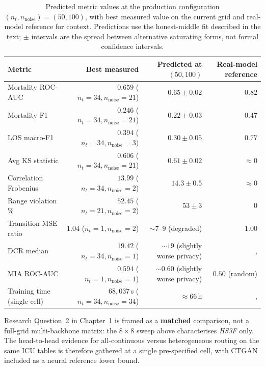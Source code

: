 \begin{table}[h]\centering
\small
\begin{tabular}{lrrr}
\toprule
Metric & Best measured & Predicted at $(50, 100)$ & Real-model reference \\
\midrule
Mortality ROC-AUC       & $0.659$ ($n_t{=}34, n_{\text{noise}}{=}21$) & $0.65 \pm 0.02$ & $0.82$ \\
Mortality F1            & $0.246$ ($n_t{=}34, n_{\text{noise}}{=}21$) & $0.22 \pm 0.03$ & $0.47$ \\
LOS macro-F1            & $0.394$ ($n_t{=}34, n_{\text{noise}}{=}3$) & $0.30 \pm 0.05$ & $0.77$ \\
Avg KS statistic        & $0.606$ ($n_t{=}34, n_{\text{noise}}{=}21$)    & $0.61 \pm 0.02$    & $\approx 0$ \\
Correlation Frobenius   & $13.99$ ($n_t{=}34, n_{\text{noise}}{=}2$)    & $14.3 \pm 0.5$     & $\approx 0$ \\
Range violation \%      & $52.45$ ($n_t{=}21, n_{\text{noise}}{=}2$) & $53 \pm 3$ & $0$ \\
Transition MSE ratio    & $1.04$ ($n_t{=}1, n_{\text{noise}}{=}2$)      & $\sim 7$--$9$ (degraded) & $1.00$ \\
DCR median              & $19.42$ ($n_t{=}34, n_{\text{noise}}{=}1$)     & $\sim 19$ (slightly worse privacy) & ,  \\
MIA ROC-AUC             & $0.594$ ($n_t{=}1, n_{\text{noise}}{=}1$)     & $\sim 0.60$ (slightly worse privacy) & $0.50$ (random) \\
Training time (single cell) & $68{,}037$\,s ($n_t{=}34, n_{\text{noise}}{=}34$) & $\approx 66$\,h & ,  \\
\bottomrule
\end{tabular}
\caption{Predicted metric values at the production configuration $(n_t, n_{\text{noise}}){=}(50, 100)$, with best measured value on the current grid and real-model reference for context. Predictions use the honest-middle fit described in the text; $\pm$ intervals are the spread between alternative saturating forms, not formal confidence intervals.}
\label{tab:sweep_pred}
\end{table}

Research Question~2 in Chapter~1 is framed as a \textbf{matched} comparison, not a full-grid multi-backbone matrix: the $8 \times 8$ sweep above characterises \emph{HS3F} only. The head-to-head evidence for all-continuous versus heterogeneous routing on the same ICU tables is therefore gathered at a single pre-specified cell, with CTGAN included as a neural reference lower bound.

